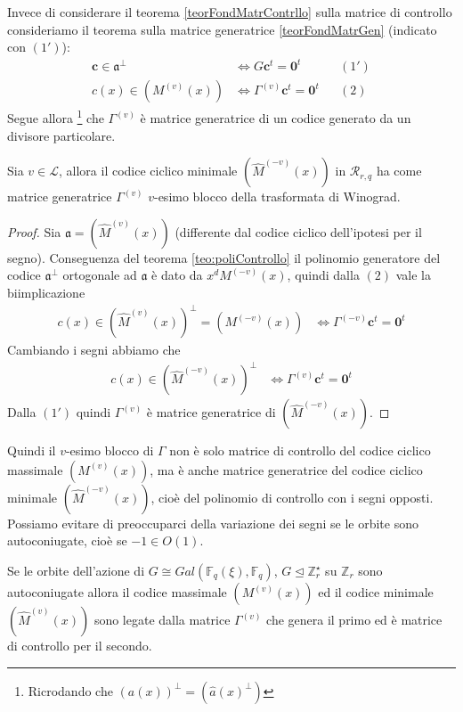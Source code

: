 Invece di considerare il teorema \ref{teorFondMatrContrllo} sulla matrice di controllo consideriamo
il teorema sulla matrice generatrice \ref{teorFondMatrGen} (indicato con $(1')$):
\begin{align*}
   \mathbf{c} \in \mathfrak{a}^{\perp} &\iff G \mathbf{c}^{t} = \mathbf{0}^{t} & & (1') \\
   c(x) \in (M^{(v)}(x)) &\iff \Gamma^{(v)} \mathbf{c}^{t} = \mathbf{0}^{t}  & & (2)
\end{align*}
Segue allora \footnote{Ricrodando che $(a(x))^{\perp} = (\hat{a}(x)^{\perp})$} che $\Gamma^{(v)}$ è matrice generatrice di un codice generato da un divisore particolare.
\begin{teorema}
   Sia $v \in \mathscr{L}$, allora il codice ciclico minimale $(\hat{M}^{(-v)}(x))$ in $\mathcal{R}_{r,q}$ ha come matrice generatrice $\Gamma^{(v)} $ $v$-esimo blocco della trasformata di Winograd.
\end{teorema}
\begin{proof}
   Sia $\mathfrak{a} = (\hat{M}^{(v)}(x))$ (differente dal codice ciclico dell'ipotesi per il segno). Conseguenza del teorema \ref{teo:poliControllo} il polinomio generatore del codice $\mathfrak{a}^{\perp}$ ortogonale ad $\mathfrak{a}$ è dato da $x^{d} M^{(-v)}(x)$, quindi dalla $(2)$ vale la biimplicazione
   \begin{align*}
      c(x) \in (\hat{M}^{(v)}(x))^{\perp} = ( M^{(-v)}(x))
      &\iff
      \Gamma^{(-v)} \mathbf{c}^{t} = \mathbf{0}^{t}
   \end{align*}
   Cambiando i segni abbiamo che
   \begin{align*}
      c(x) \in (\hat{M}^{(-v)}(x))^{\perp}
      &\iff
      \Gamma^{(v)} \mathbf{c}^{t} = \mathbf{0}^{t}
   \end{align*}
  Dalla $(1')$ quindi  $\Gamma^{(v)}$ è matrice generatrice di $(\hat{M}^{(-v)}(x))$.
\end{proof}
Quindi il $v$-esimo blocco di $\Gamma$ non è solo matrice di controllo del codice ciclico massimale $(M^{(v)}(x))$, ma è anche matrice generatrice del codice ciclico minimale $(\hat{M}^{(-v)}(x))$, cioè del polinomio di controllo con i segni opposti. Possiamo evitare di preoccuparci della variazione dei segni se le orbite sono autoconiugate, cioè se $-1 \in O(1)$.
\begin{corollario}
   Se le orbite dell'azione di $G \cong Gal(\mathbb{F}_{q}(\xi),\mathbb{F}_{q})$, $G \trianglelefteq \mathbb{Z}_{r}^{\star} $ su $\mathbb{Z}_{r}$ sono autoconiugate allora il codice massimale $(M^{(v)}(x))$ ed il codice minimale $(\hat{M}^{(v)}(x))$ sono legate dalla matrice $\Gamma^{(v)}$ che genera il primo ed è matrice di controllo per il secondo.
\end{corollario}
